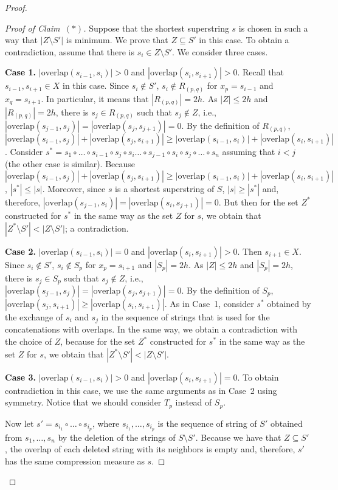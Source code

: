 \documentclass[11pt]{article}
\newcommand{\overlap}{\textrm{overlap}}
\begin{document}
\begin{proof}
\begin{proof}[Proof of Claim~$(*)$]
Suppose that the shortest superstring $s$ is chosen in such a way that $|Z\setminus S'|$ is minimum. We prove that $Z\subseteq S'$ in this case.
To obtain a contradiction, assume that there is $s_i\in Z\setminus S'$. We consider three cases.

\medskip
\noindent
{\bf Case 1.} $|\overlap(s_{i-1},s_i)|>0$ and $|\overlap(s_i,s_{i+1})|>0$. Recall that $s_{i-1},s_{i+1}\in X$ in this case. Since $s_i\notin S'$, $s_i\notin R_{(p,q)}$ for $x_p=s_{i-1}$ and $x_q=s_{i+1}$.
In particular, it means that $|R_{(p,q)}|=2h$. As $|Z|\leq 2h$ and $|R_{(p,q)}|=2h$, there is $s_j\in R_{(p,q)}$ such that $s_j\notin Z$, i.e., $|\overlap(s_{j-1},s_j)|=|\overlap(s_j,s_{j+1})|=0$. By the definition of $R_{(p,q)}$, $|\overlap(s_{i-1},s_j)|+|\overlap(s_j,s_{i+1})| \geq
 |\overlap(s_{i-1},s_i)|+|\overlap(s_i,s_{i+1})|$.  Consider 
$s^*=s_1\circ\ldots\circ s_{i-1}\circ s_j\circ s_i\ldots \circ s_{j-1}\circ s_i\circ s_j\circ \ldots \circ s_n$ assuming that $i<j$ (the other case is similar). Because 
$|\overlap(s_{i-1},s_j)|+|\overlap(s_j,s_{i+1})|\geq |\overlap(s_{i-1},s_i)|+|\overlap(s_i,s_{i+1})|$, $|s^*|\leq |s|$. Moreover, since $s$ is a shortest superstring of $S$, 
$|s|\geq |s^*|$ and, therefore, $|\overlap(s_{j-1},s_i)|=|\overlap(s_i,s_{j+1})|=0$. But then for  the set $Z^*$ constructed for $s^*$ in the same way as the set $Z$ for $s$, we obtain that 
$|Z^*\setminus S'|<|Z\setminus S'|$; a contradiction.


\medskip
\noindent
{\bf Case 2.} $|\overlap(s_{i-1},s_i)|=0$ and $|\overlap(s_i,s_{i+1})|>0$. Then $s_{i+1}\in X$.
 Since $s_i\notin S'$, $s_i\notin S_{p}$ for $x_p=s_{i+1}$ and $|S_p|=2h$. 
As $|Z|\leq 2h$ and $|S_p|=2h$, there is $s_j\in S_p$ such that $s_j\notin Z$, i.e., 
$|\overlap(s_{j-1},s_j)|=|\overlap(s_j,s_{j+1})|=0$. By the definition of $S_p$,
$|\overlap(s_j,s_{i+1})|\geq |\overlap(s_i,s_{i+1})|$.  
As in Case~1, consider $s^*$ obtained by the exchange of $s_i$ and $s_j$ in the sequence of strings that is used for the concatenations with overlaps.   
In the same way, we obtain a contradiction with the choice of $Z$, because for  the set $Z^*$ constructed for $s^*$ in the same way as the set $Z$ for $s$, we obtain that 
$|Z^*\setminus S'|<|Z\setminus S'|$.

\medskip
\noindent
{\bf Case 3.} $|\overlap(s_{i-1},s_i)|>0$ and $|\overlap(s_i,s_{i+1})|=0$. To obtain contradiction in this case, we use the same arguments as in Case~2 using symmetry. Notice that we should consider $T_p$ instead of $S_p$.

\medskip
Now  let $s'=s_{i_1}\circ\ldots\circ s_{i_p}$, where $s_{i_1},\ldots,s_{i_p}$ is the sequence of string of $S'$ obtained from $s_1,\ldots,s_n$ by the deletion of the strings of $S\setminus S'$. Because we have that $Z\subseteq S'$, the overlap of each deleted string with its neighbors is empty and, therefore, $s'$ has the same compression measure as $s$.
\end{proof}


\end{proof}
\end{document}
